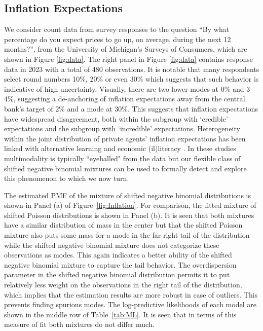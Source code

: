 \documentclass[11pt]{article}
\begin{document}
\subsection{Inflation Expectations}
We consider count data from survey responses to the question ``By what percentage do you expect prices to go up, on average, during the next 12 months?'', from the University of Michigan's Surveys of Consumers, which are shown in  Figure \ref{fig:data}. The right panel in Figure \ref{fig:data} contains response data in 2023 with a total of 480 observations.  It is notable that many respondents select round numbers 10\%, 20\% or even 30\% which suggests that such behavior is indicative of high uncertainty. Visually, there are two lower modes at 0\% and 3-4\%, suggesting a de-anchoring of inflation expectations away from the central bank's target of 2\% and a mode at 30\%.  This suggests that inflation expectations have widespread disagreement,  both within the subgroup with `credible' expectations and the subgroup with `incredible' expectations. Heterogeneity within the joint distribution of private agents' inflation expectations has been linked with alternative learning \citep{pfajfar2010heterogeneity} and economic (il)literacy \citep{burke2014economic}. In these studies multimodality is typically ``eyeballed" from the data but our flexible class of shifted negative binomial mixtures can be used to formally detect and explore this phenomenon to which we now turn.


The estimated PMF of the mixture of shifted negative binomial distributions is shown in Panel (a) of Figure~\ref{fig:Inflation}. For comparison, the fitted mixture of shifted Poisson distributions is shown in Panel (b). It is seen that both mixtures have a similar distribution of mass in the center but that the shifted Poisson mixture also puts some mass for a mode in the far right tail of the distribution  while the shifted negative binomial mixture does not categorize these observations as modes. This again indicates a better ability of the shifted negative binomial mixture to capture the tail behavior. The overdispersion parameter in the shifted negative binomial distribution permits it to put relatively less weight on the observations in the right tail of the distribution, which implies that the estimation results are more robust in case of outliers. This prevents finding spurious modes. The log-predictive likelihoods of each model are shown in the middle row of Table~\ref{tab:ML}. It is seen that in terms of this measure of fit both mixtures do not differ much.
\end{document}
